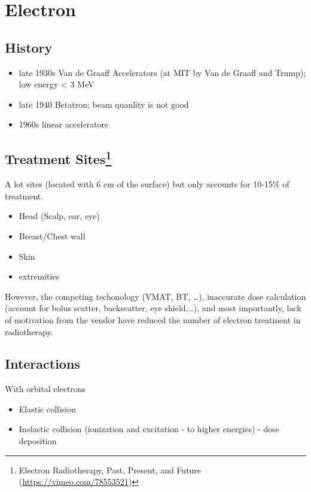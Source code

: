 \documentclass[]{book}
\providecommand{\tightlist}{%
  \setlength{\itemsep}{0pt}\setlength{\parskip}{0pt}}
\let\rmarkdownfootnote\footnote%
\def\footnote{\protect\rmarkdownfootnote}
\theoremstyle{definition}
\theoremstyle{definition}
\theoremstyle{definition}
\theoremstyle{remark}
\begin{document}
\chapter{Electron}\label{electron}

\section{History}\label{history-2}

\begin{itemize}
\tightlist
\item
  late 1930s Van de Graaff Accelerators (at MIT by Van de Graaff and
  Trump); low energy \textless{} 3 MeV
\item
  late 1940 Betatron; beam quanlity is not good
\item
  1960s linear accelerators
\end{itemize}

\section[Treatment Sites]{\texorpdfstring{Treatment Sites\footnote{Electron
  Radiotherapy, Past, Present, and Future
  (\url{https://vimeo.com/78553521})}}{Treatment Sites}}\label{treatment-sites}

A lot sites (located with 6 cm of the surface) but only accounts for
10-15\% of treatment.

\begin{itemize}
\tightlist
\item
  Head (Scalp, ear, eye)
\item
  Breast/Chest wall
\item
  Skin
\item
  extremities
\end{itemize}

However, the competing techonology (VMAT, BT, \ldots{}), inaccurate dose
calculation (account for bolus scatter, backscatter, eye
shield,\ldots{}), and most importantly, lack of motivation from the
vendor have reduced the number of electron treatment in radiotherapy.

\section{Interactions}\label{e-interactions}

With orbital electrons

\begin{itemize}
\tightlist
\item
  Elastic collision
\item
  Inelastic collision (ionization and excitation - to higher energies) -
  dose deposition
\end{itemize}
\end{document}
